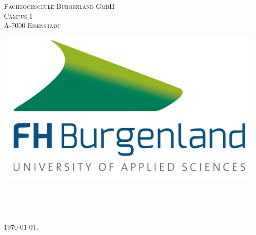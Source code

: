 \makeatletter

\begin{titlepage}
\noindent
\begin{minipage}[t]{0.5\textwidth}
\vspace{0pt} %
\textsc{Fachhochschule Burgenland GmbH\\Campus 1\\A-7000 Eisenstadt}
\end{minipage}%
\hfill
\begin{minipage}[t]{0.4\textwidth}
\vspace{0pt} %
\raggedleft %
\includegraphics[scale=0.4]{images/logofh}
\end{minipage}


\begin{center}
{ \huge \bfseries \@title}\\[0.4cm]
\subtitle\\
\end{center}


\vfill
\begin{minipage}{\textwidth}
\@author\\
\supervisor\\
\today, \city\\
\end{minipage}


\end{titlepage}
